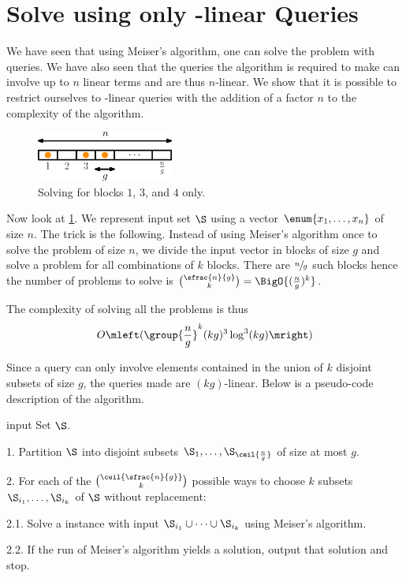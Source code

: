 \section{Solve \kSUM using only -linear Queries}

We have seen that using Meiser's algorithm, one can solve the \kSUM problem
with  queries. We have also seen that the queries the
algorithm is required to make can involve up to \(n\) linear terms and are thus
\(n\)-linear. We show that it is possible to restrict ourselves to
-linear queries with the addition of a factor \(n\) to the complexity
of the algorithm.

\begin{figure}
\centering
\includegraphics[width=0.4\textwidth]{fig/point-location/blocks}
\caption{Solving \kSUM for blocks \(1\), \(3\), and \(4\) only.}
\label{fig:point-location:on:blocks}
\end{figure}

Now look at \ref{fig:point-location:on:blocks}. We represent input set \(\S\)
using a vector \(\enum{x_1,\ldots,x_n}\) of size \(n\). The trick is the
following. Instead of using Meiser's algorithm once to solve the problem of
size \(n\), we divide the input vector in blocks of size \(g\) and solve a
\kSUM problem for all combinations of \(k\) blocks. There are \(\sfrac{n}{g}\)
such blocks hence the number of problems to solve is \(\binom{\sfrac{n}{g}}{k}
= \BigO{(\frac{n}{g})^k} \).

The complexity of solving all the problems is thus
\begin{displaymath}
O\mleft(\group{\frac{n}{g}}^k (kg)^3 \log^3 (kg)\mright)
\end{displaymath}

Since a query can only involve elements contained in the union of \(k\)
disjoint subsets of size \(g\), the queries made are \((kg)\)-linear. Below is
a pseudo-code description of the algorithm.
\begin{algorithm}
\item[input] Set \(\S\).
\item[1.] Partition \(\S\) into disjoint subsets
\(\S_1,\ldots,\S_{\ceil{\frac{n}{g}}}\) of size at most \(g\).
\item[2.] For each of the \(\binom{\ceil{\sfrac{n}{g}}}{k}\) possible ways to
choose \(k\) subsets \(\S_{i_1},\ldots,\S_{i_k}\) of \(\S\) without
replacement:
\item[2.1.] Solve a \kSUM instance with input \(\S_{i_1} \cup \cdots \cup
\S_{i_k}\) using Meiser's algorithm.
\item[2.2.] If the run of Meiser's algorithm yields a solution, output that
solution and stop.
\end{algorithm}

